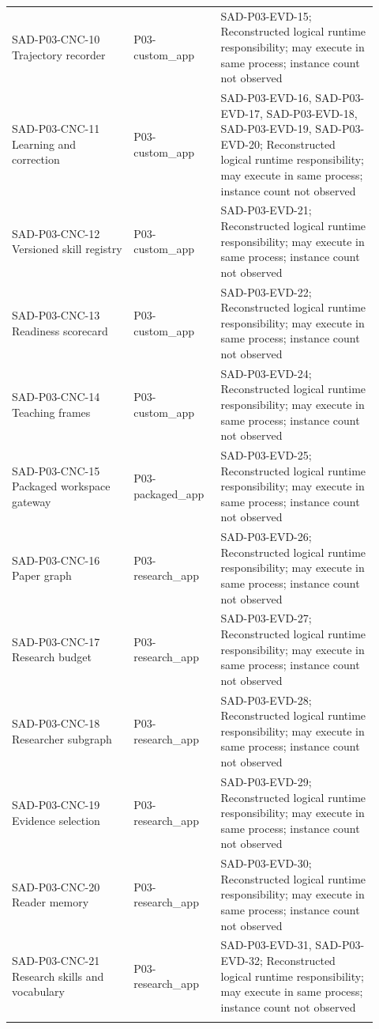 \documentclass[10pt,letterpaper]{article}
\begin{document}
\begin{longtable}{@{}>{\raggedright\arraybackslash}p{0.31\linewidth}>{\raggedright\arraybackslash}p{0.21\linewidth}>{\raggedright\arraybackslash}p{0.4\linewidth}@{}}
SAD-P03-CNC-10 Trajectory recorder & P03-custom\_app & SAD-P03-EVD-15; Reconstructed logical runtime responsibility; may execute in same process; instance count not observed\\\addlinespace
SAD-P03-CNC-11 Learning and correction & P03-custom\_app & SAD-P03-EVD-16, SAD-P03-EVD-17, SAD-P03-EVD-18, SAD-P03-EVD-19, SAD-P03-EVD-20; Reconstructed logical runtime responsibility; may execute in same process; instance count not observed\\\addlinespace
SAD-P03-CNC-12 Versioned skill registry & P03-custom\_app & SAD-P03-EVD-21; Reconstructed logical runtime responsibility; may execute in same process; instance count not observed\\\addlinespace
SAD-P03-CNC-13 Readiness scorecard & P03-custom\_app & SAD-P03-EVD-22; Reconstructed logical runtime responsibility; may execute in same process; instance count not observed\\\addlinespace
SAD-P03-CNC-14 Teaching frames & P03-custom\_app & SAD-P03-EVD-24; Reconstructed logical runtime responsibility; may execute in same process; instance count not observed\\\addlinespace
SAD-P03-CNC-15 Packaged workspace gateway & P03-packaged\_app & SAD-P03-EVD-25; Reconstructed logical runtime responsibility; may execute in same process; instance count not observed\\\addlinespace
SAD-P03-CNC-16 Paper graph & P03-research\_app & SAD-P03-EVD-26; Reconstructed logical runtime responsibility; may execute in same process; instance count not observed\\\addlinespace
SAD-P03-CNC-17 Research budget & P03-research\_app & SAD-P03-EVD-27; Reconstructed logical runtime responsibility; may execute in same process; instance count not observed\\\addlinespace
SAD-P03-CNC-18 Researcher subgraph & P03-research\_app & SAD-P03-EVD-28; Reconstructed logical runtime responsibility; may execute in same process; instance count not observed\\\addlinespace
SAD-P03-CNC-19 Evidence selection & P03-research\_app & SAD-P03-EVD-29; Reconstructed logical runtime responsibility; may execute in same process; instance count not observed\\\addlinespace
SAD-P03-CNC-20 Reader memory & P03-research\_app & SAD-P03-EVD-30; Reconstructed logical runtime responsibility; may execute in same process; instance count not observed\\\addlinespace
SAD-P03-CNC-21 Research skills and vocabulary & P03-research\_app & SAD-P03-EVD-31, SAD-P03-EVD-32; Reconstructed logical runtime responsibility; may execute in same process; instance count not observed\\\addlinespace
\bottomrule\end{longtable}
\end{document}
